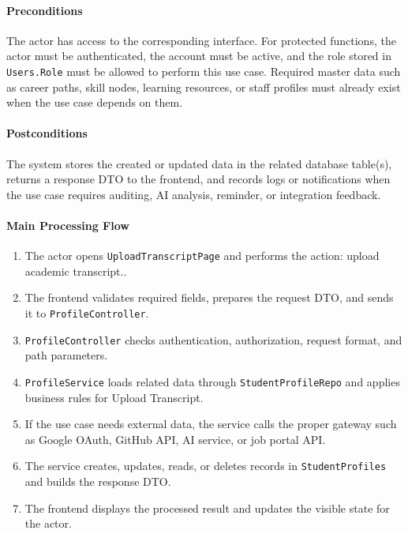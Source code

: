 \paragraph{Preconditions}

The actor has access to the corresponding interface. For protected functions, the actor must be authenticated, the account must be active, and the role stored in \texttt{Users.Role} must be allowed to perform this use case. Required master data such as career paths, skill nodes, learning resources, or staff profiles must already exist when the use case depends on them.

\paragraph{Postconditions}

The system stores the created or updated data in the related database table(s), returns a response DTO to the frontend, and records logs or notifications when the use case requires auditing, AI analysis, reminder, or integration feedback.

\paragraph{Main Processing Flow}

\begin{enumerate}
    \item The actor opens \texttt{UploadTranscriptPage} and performs the action: upload academic transcript..
    \item The frontend validates required fields, prepares the request DTO, and sends it to \texttt{ProfileController}.
    \item \texttt{ProfileController} checks authentication, authorization, request format, and path parameters.
    \item \texttt{ProfileService} loads related data through \texttt{StudentProfileRepo} and applies business rules for Upload Transcript.
    \item If the use case needs external data, the service calls the proper gateway such as Google OAuth, GitHub API, AI service, or job portal API.
    \item The service creates, updates, reads, or deletes records in \texttt{StudentProfiles} and builds the response DTO.
    \item The frontend displays the processed result and updates the visible state for the actor.
\end{enumerate}

